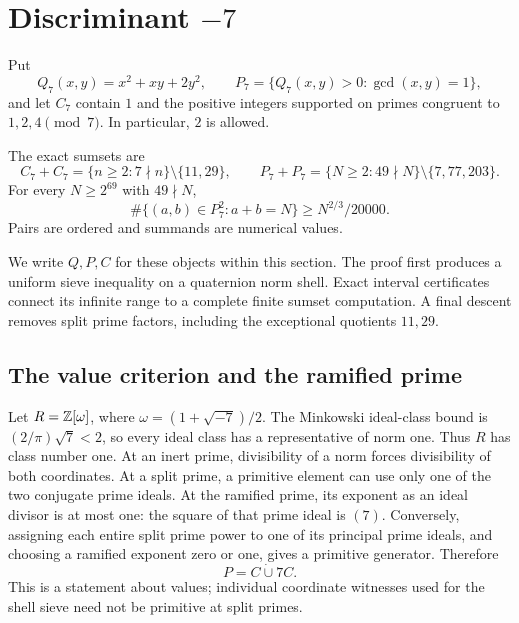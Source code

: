 \section{Discriminant \texorpdfstring{\(-7\)}{-7}}\label{sec:minus7}

Put
\[
 Q_7(x,y)=x^2+xy+2y^2,\qquad
 P_7=\{Q_7(x,y)>0:\gcd(x,y)=1\},
\]
and let \(C_7\) contain \(1\) and the positive integers supported on
primes congruent to \(1,2,4\pmod7\). In particular, \(2\) is allowed.

\begin{theorem}\label{thm:minus7-exact}
The exact sumsets are
\[
 C_7+C_7=\{n\ge2:7\nmid n\}\setminus\{11,29\},
 \qquad
 P_7+P_7=\{N\ge2:49\nmid N\}\setminus\{7,77,203\}.
\]
For every \(N\ge2^{69}\) with \(49\nmid N\),
\[
       \#\{(a,b)\in P_7^2:a+b=N\}\ge N^{2/3}/20000.
\]
Pairs are ordered and summands are numerical values.
\end{theorem}

We write \(Q,P,C\) for these objects within this section.
The proof first produces a uniform sieve inequality on a quaternion
norm shell. Exact interval certificates connect its infinite range
to a complete finite sumset computation. A final descent removes
split prime factors, including the exceptional quotients \(11,29\).

\subsection{The value criterion and the ramified prime}

Let \(R=\mathbb Z[\omega]\), where \(\omega=(1+\sqrt{-7})/2\).
The Minkowski ideal-class bound is
\((2/\pi)\sqrt7<2\), so every ideal class has a representative of
norm one. Thus \(R\) has class number one. At an inert prime,
divisibility of a norm forces divisibility of both coordinates.
At a split prime, a primitive element can use only one of the two
conjugate prime ideals. At the ramified prime, its exponent as an
ideal divisor is at most one: the square of that prime ideal is
\((7)\). Conversely, assigning each entire split prime power to
one of its principal prime ideals, and choosing a ramified exponent
zero or one, gives a primitive generator. Therefore
\begin{equation}
                         P=C\mathbin{\dot\cup}7C.               \label{eq:m7-value}
\end{equation}
This is a statement about values; individual coordinate witnesses
used for the shell sieve need not be primitive at split primes.

